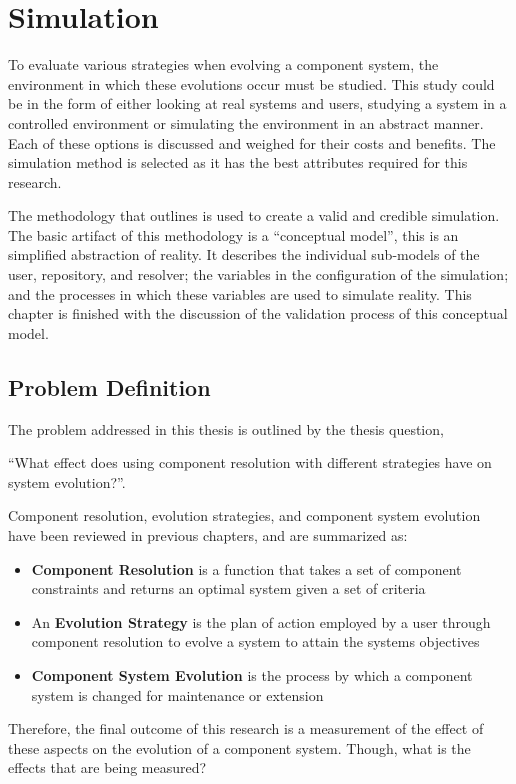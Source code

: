 \chapter{Simulation}
\label{simulation}
{}To evaluate various strategies when evolving a component system, the environment in which these evolutions occur must be studied.
{}This study could be in the form of either looking at real systems and users, studying a system in a controlled environment or simulating the environment in an abstract manner.
{}Each of these options is discussed and weighed for their costs and benefits.
{}The simulation method is selected as it has the best attributes required for this research.

{}The methodology that \cite{Law2005} outlines is used to create a valid and credible simulation.
{}The basic artifact of this methodology is a ``conceptual model'', this is an simplified abstraction of reality.
{}It describes the individual sub-models of the user, repository, and resolver; the variables in the configuration of the simulation;
{}and the processes in which these variables are used to simulate reality.
{}This chapter is finished with the discussion of the validation process of this conceptual model.

\section{Problem Definition}
The problem addressed in this thesis is outlined by the thesis question,

``What effect does using component resolution with different strategies have on system evolution?''.

Component resolution, evolution strategies, and component system evolution have been reviewed in previous chapters, and are summarized as:
\begin{itemize}
  \item \textbf{Component Resolution} is a function that takes a set of component constraints and returns an optimal system given a set of criteria
  \item An \textbf{Evolution Strategy} is the plan of action employed by a user through component resolution to evolve a system to attain the systems objectives
  \item \textbf{Component System Evolution} is the process by which a component system is changed for maintenance or extension 
\end{itemize}

Therefore, the final outcome of this research is a measurement of the effect of these aspects on the evolution of a component system. 
Though, what is the effects that are being measured?

